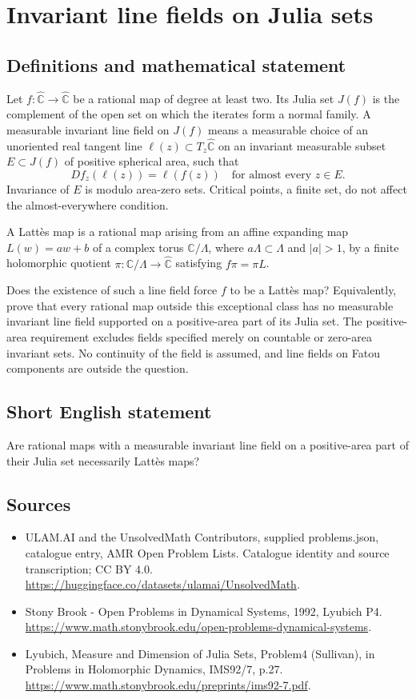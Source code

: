 \documentclass[11pt,a4paper]{article}
\begin{document}
\section*{Invariant line fields on Julia sets}\label{statement}

\subsection{Definitions and mathematical statement}
Let $f:\widehat{\mathbb C}\to\widehat{\mathbb C}$
be a rational map of degree at least two.
Its Julia set $J(f)$ is the complement of
the open set on which the iterates form
a normal family. A measurable invariant
line field on $J(f)$ means a measurable
choice of an unoriented real tangent line
$\ell(z)\subset T_z\widehat{\mathbb C}$ on
an invariant measurable subset $E\subset J(f)$
of positive spherical area, such that
\[
                    Df_z(\ell(z))=\ell(f(z))
                           \quad\text{for almost every }z\in E.
\]
Invariance of $E$ is modulo area-zero sets.
Critical points, a finite set, do not
affect the almost-everywhere condition.

A Latt\`es map is a rational map arising
from an affine expanding map $L(w)=aw+b$
of a complex torus $\mathbb C/\Lambda$,
where $a\Lambda\subset\Lambda$ and $|a|>1$,
by a finite holomorphic quotient
$\pi:\mathbb C/\Lambda\to\widehat{\mathbb C}$
satisfying $f\pi=\pi L$.

Does the existence of such a line field
force $f$ to be a Latt\`es map? Equivalently,
prove that every rational map outside
this exceptional class has no measurable
invariant line field supported on a
positive-area part of its Julia set.
The positive-area requirement excludes fields
specified merely on countable or zero-area
invariant sets. No continuity of the
field is assumed, and line fields on
Fatou components are outside the question.
\subsection{Short English statement}
Are rational maps with a measurable invariant line field on a positive-area part of their Julia set necessarily Lattès maps?
\subsection{Sources}
\begin{itemize}
\item[S1] ULAM.AI and the UnsolvedMath Contributors, supplied problems.json, catalogue entry, AMR Open Problem Lists. Catalogue identity and source transcription; CC BY 4.0.
\url{https://huggingface.co/datasets/ulamai/UnsolvedMath}.
\item[S2] Stony Brook - Open Problems in Dynamical Systems, 1992, Lyubich P4. 
\url{https://www.math.stonybrook.edu/open-problems-dynamical-systems}.
\item[S3] Lyubich, Measure and Dimension of Julia Sets, Problem4 (Sullivan), in Problems in Holomorphic Dynamics, IMS92/7, p.27.
\url{https://www.math.stonybrook.edu/preprints/ims92-7.pdf}.
\end{itemize}
\end{document}
